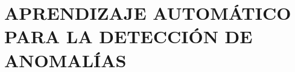 
\chapter{\uppercase{Aprendizaje Autom\'{a}tico para la detecci\'{o}n de anomal\'{i}as}}
\label{Capitulo 4}


